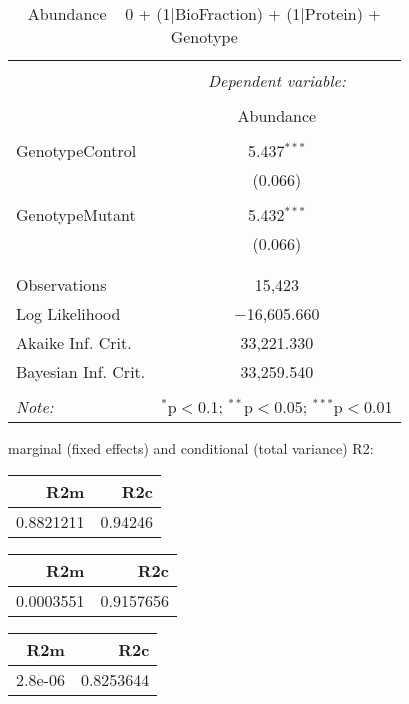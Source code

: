 \documentclass[11pt]{report}
\begin{document}
\begin{table}[!htbp] \centering 
  \caption{Abundance ~ 0 + (1|BioFraction) + (1|Protein) + Genotype} 
  \label{} 
\begin{tabular}{@{\extracolsep{5pt}}lc} 
\\[-1.8ex]\hline 
\hline \\[-1.8ex] 
 & \multicolumn{1}{c}{\textit{Dependent variable:}} \\ 
\cline{2-2} 
\\[-1.8ex] & Abundance \\ 
\hline \\[-1.8ex] 
 GenotypeControl & 5.437$^{***}$ \\ 
  & (0.066) \\ 
  & \\ 
 GenotypeMutant & 5.432$^{***}$ \\ 
  & (0.066) \\ 
  & \\ 
\hline \\[-1.8ex] 
Observations & 15,423 \\ 
Log Likelihood & $-$16,605.660 \\ 
Akaike Inf. Crit. & 33,221.330 \\ 
Bayesian Inf. Crit. & 33,259.540 \\ 
\hline 
\hline \\[-1.8ex] 
\textit{Note:}  & \multicolumn{1}{r}{$^{*}$p$<$0.1; $^{**}$p$<$0.05; $^{***}$p$<$0.01} \\ 
\end{tabular} 
\end{table} 
marginal (fixed effects) and conditional (total variance) R2:

\begin{tabular}{r|r}
\hline
R2m & R2c\\
\hline
0.8821211 & 0.94246\\
\hline
\end{tabular}

\begin{tabular}{r|r}
\hline
R2m & R2c\\
\hline
0.0003551 & 0.9157656\\
\hline
\end{tabular}

\begin{tabular}{r|r}
\hline
R2m & R2c\\
\hline
2.8e-06 & 0.8253644\\
\hline
\end{tabular}
\end{document}
